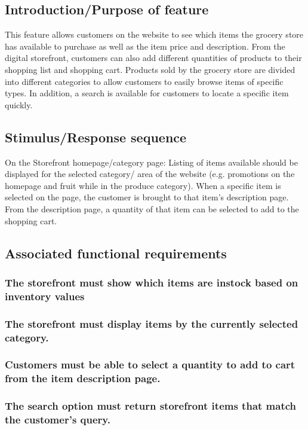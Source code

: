 \documentclass{scrreprt}
\begin{document}
\subsection{Introduction/Purpose of feature}
This feature allows customers on the website to see which items the grocery store has available to purchase as well as the item price and description.  From the digital storefront, customers can also add different quantities of products to their shopping list and shopping cart.  Products sold by the grocery store are divided into different categories to allow customers to easily browse items of specific types.  In addition, a search is available for customers to locate a specific item quickly.
\subsection{Stimulus/Response sequence}
On the Storefront homepage/category page: Listing of items available should be displayed for the selected category/ area of the website (e.g. promotions on the homepage and fruit while in the produce category).  When a specific item is selected on the page, the customer is brought to that item’s description page.  From the description page, a quantity of that item can be selected to add to the shopping cart.  
\subsection{Associated functional requirements}
\subsubsection[]{\normalfont The storefront must show which items are instock based on inventory values}
\subsubsection[]{\normalfont The storefront must display items by the currently selected category.}
\subsubsection[]{\normalfont Customers must be able to select a quantity to add to cart from the item description page.}
\subsubsection[]{\normalfont The search option must return storefront items that match the customer’s query.}
\end{document}
